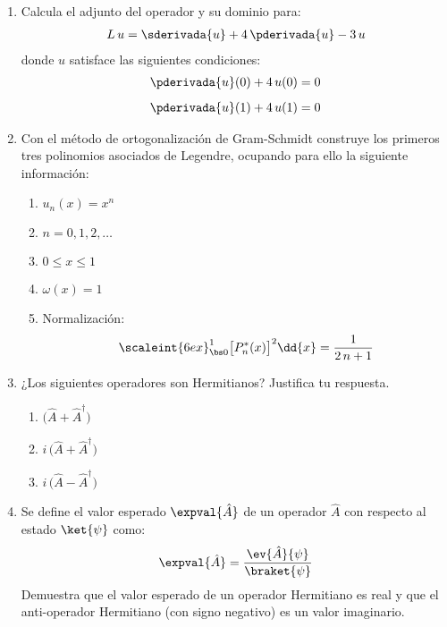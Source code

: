 \begin{enumerate}
\item Calcula el adjunto del operador y su dominio para:
\begin{align*}
L \, u = \sderivada{u} +  4 \, \pderivada{u} - 3 \, u
\end{align*}
donde $u$ satisface las siguientes condiciones:
\begin{align*}
\pderivada{u}(0) + 4 \, u(0) &= 0 \\[0.5em]
\pderivada{u}(1) + 4 \, u(1) &= 0
\end{align*}
\item Con el método de ortogonalización de Gram-Schmidt construye los primeros tres polinomios asociados de Legendre, ocupando para ello la siguiente información:
\begin{enumerate}[label=\alph*)]
\item $u_{n}(x) = x^{n}$
\item $n = 0, 1, 2, \ldots$
\item $0 \leq x \leq 1$
\item $\omega (x) = 1$
\item Normalización:
\begin{align*}
\scaleint{6ex}_{\bs 0}^{1} \big[ P_{n}^{*} (x) \big]^{2} \dd{x} = \dfrac{1}{2 \, n + 1}
\end{align*}
\end{enumerate} 
\item ¿Los siguientes operadores son Hermitianos? Justifica tu respuesta.
\begin{enumerate}[label=\roman*)]
\item $\big( \hat{A} + \hat{A}^{\dagger} \big)$
\item $i \, \big( \hat{A} + \hat{A}^{\dagger} \big)$
\item $i \, \big( \hat{A} - \hat{A}^{\dagger} \big)$
\end{enumerate}
\item Se define el valor esperado $\expval{\hat{A}}$ de un operador $\hat{A}$ con respecto al estado $\ket{\psi}$ como:
\begin{align*}
\expval{\hat{A}} = \dfrac{\ev{\hat{A}}{\psi}}{\braket{\psi}}    
\end{align*}
Demuestra que el valor esperado de un operador Hermitiano es real y que el anti-operador Hermitiano (con signo negativo) es un valor imaginario.

\end{enumerate}
